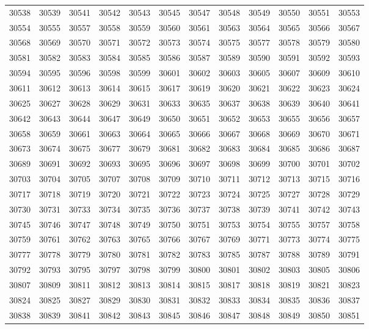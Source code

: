 \begin{center}
\begin{longtable}{llllllllllll}
30538 &30539 &30541 &30542 &30543 &30545 &30547 &30548 &30549 &30550 &30551 &30553 \\
30554 &30555 &30557 &30558 &30559 &30560 &30561 &30563 &30564 &30565 &30566 &30567 \\
30568 &30569 &30570 &30571 &30572 &30573 &30574 &30575 &30577 &30578 &30579 &30580 \\
30581 &30582 &30583 &30584 &30585 &30586 &30587 &30589 &30590 &30591 &30592 &30593 \\
30594 &30595 &30596 &30598 &30599 &30601 &30602 &30603 &30605 &30607 &30609 &30610 \\
30611 &30612 &30613 &30614 &30615 &30617 &30619 &30620 &30621 &30622 &30623 &30624 \\
30625 &30627 &30628 &30629 &30631 &30633 &30635 &30637 &30638 &30639 &30640 &30641 \\
30642 &30643 &30644 &30647 &30649 &30650 &30651 &30652 &30653 &30655 &30656 &30657 \\
30658 &30659 &30661 &30663 &30664 &30665 &30666 &30667 &30668 &30669 &30670 &30671 \\
30673 &30674 &30675 &30677 &30679 &30681 &30682 &30683 &30684 &30685 &30686 &30687 \\
30689 &30691 &30692 &30693 &30695 &30696 &30697 &30698 &30699 &30700 &30701 &30702 \\
30703 &30704 &30705 &30707 &30708 &30709 &30710 &30711 &30712 &30713 &30715 &30716 \\
30717 &30718 &30719 &30720 &30721 &30722 &30723 &30724 &30725 &30727 &30728 &30729 \\
30730 &30731 &30733 &30734 &30735 &30736 &30737 &30738 &30739 &30741 &30742 &30743 \\
30745 &30746 &30747 &30748 &30749 &30750 &30751 &30753 &30754 &30755 &30757 &30758 \\
30759 &30761 &30762 &30763 &30765 &30766 &30767 &30769 &30771 &30773 &30774 &30775 \\
30777 &30778 &30779 &30780 &30781 &30782 &30783 &30785 &30787 &30788 &30789 &30791 \\
30792 &30793 &30795 &30797 &30798 &30799 &30800 &30801 &30802 &30803 &30805 &30806 \\
30807 &30809 &30811 &30812 &30813 &30814 &30815 &30817 &30818 &30819 &30821 &30823 \\
30824 &30825 &30827 &30829 &30830 &30831 &30832 &30833 &30834 &30835 &30836 &30837 \\
30838 &30839 &30841 &30842 &30843 &30845 &30846 &30847 &30848 &30849 &30850 &30851 \\

\end{longtable}
\end{center}
